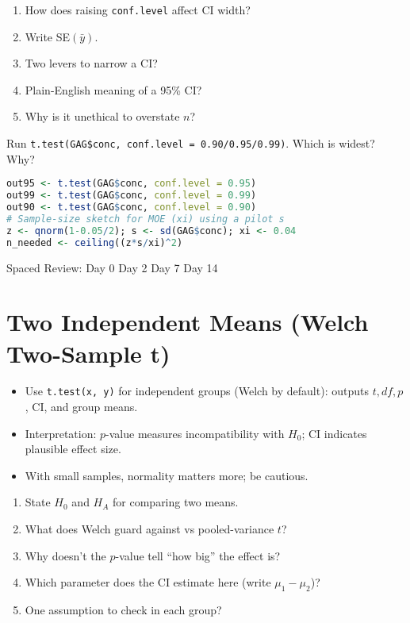 \documentclass[11pt,a4paper]{article}
\def\textbf#1{#1}%
\newcommand{\reviewticks}{
  \vspace{0.4em}
  \noindent\scriptsize\textbf{Spaced Review:}
  \fbox{\phantom{D0}} Day 0\quad
  \fbox{\phantom{D2}} Day 2\quad
  \fbox{\phantom{D7}} Day 7\quad
  \fbox{\phantom{D14}} Day 14
}
\begin{document}
\begin{recallbox}
\begin{enumerate}
  \item How does raising \texttt{conf.level} affect CI width?
  \item Write SE\((\bar{y})\).
  \item Two levers to narrow a CI?
  \item Plain-English meaning of a 95\% CI?
  \item Why is it unethical to overstate \(n\)?
\end{enumerate}
\end{recallbox}

\begin{practicebox}
Run \texttt{t.test(GAG\$conc, conf.level = 0.90/0.95/0.99)}. Which is widest? Why?
\end{practicebox}

\begin{rbox}
\begin{lstlisting}[language=R]
out95 <- t.test(GAG$conc, conf.level = 0.95)
out99 <- t.test(GAG$conc, conf.level = 0.99)
out90 <- t.test(GAG$conc, conf.level = 0.90)
# Sample-size sketch for MOE (xi) using a pilot s
z <- qnorm(1-0.05/2); s <- sd(GAG$conc); xi <- 0.04
n_needed <- ceiling((z*s/xi)^2)
\end{lstlisting}
\end{rbox}

\reviewticks

\section{Two Independent Means (Welch Two-Sample t)}

\begin{corebox}
\begin{itemize}
  \item Use \texttt{t.test(x, y)} for \textbf{independent groups} (Welch by default): outputs \(t, df, p\), CI, and group means.
  \item Interpretation: \(p\)-value measures \textbf{incompatibility with \(H_0\)}; \textbf{CI} indicates plausible effect size.
  \item With small samples, normality matters more; be cautious.
\end{itemize}
\end{corebox}

\begin{recallbox}
\begin{enumerate}
  \item State \(H_0\) and \(H_A\) for comparing two means.
  \item What does Welch guard against vs pooled-variance \(t\)?
  \item Why doesn’t the \(p\)-value tell ``how big'' the effect is?
  \item Which parameter does the CI estimate here (write \(\mu_1 - \mu_2\))?
  \item One assumption to check in each group?
\end{enumerate}
\end{recallbox}
\end{document}
